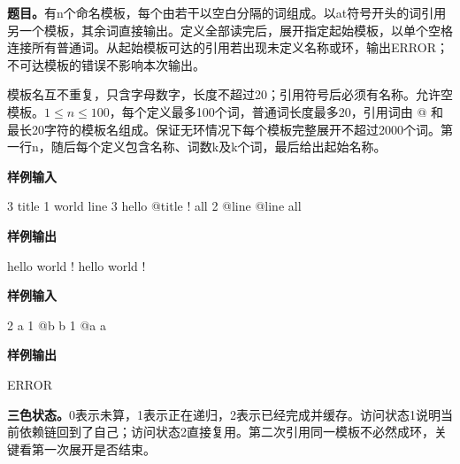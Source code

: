 \documentclass[UTF8,11pt,a4paper,fontset=none]{ctexart}
\begin{document}
\noindent\textbf{题目。}有n个命名模板，每个由若干以空白分隔的词组成。以at符号开头的词引用另一个模板，其余词直接输出。定义全部读完后，展开指定起始模板，以单个空格连接所有普通词。从起始模板可达的引用若出现未定义名称或环，输出ERROR；不可达模板的错误不影响本次输出。

模板名互不重复，只含字母数字，长度不超过20；引用符号后必须有名称。允许空模板。$1\le n\le100$，每个定义最多100个词，普通词长度最多20，引用词由 @ 和最长20字符的模板名组成。保证无环情况下每个模板完整展开不超过2000个词。第一行n，随后每个定义包含名称、词数k及k个词，最后给出起始名称。
\begin{tcolorbox}[samplebox,title={输入输出样例 1}]
\textbf{样例输入}
\begin{Sample}
3
title 1 world
line 3 hello @title !
all 2 @line @line
all
\end{Sample}
\tcblower
\textbf{样例输出}
\begin{Sample}
hello world ! hello world !
\end{Sample}
\end{tcolorbox}
\begin{tcolorbox}[samplebox,title={输入输出样例 2}]
\textbf{样例输入}
\begin{Sample}
2
a 1 @b
b 1 @a
a
\end{Sample}
\tcblower
\textbf{样例输出}
\begin{Sample}
ERROR
\end{Sample}
\end{tcolorbox}

\noindent\textbf{三色状态。}0表示未算，1表示正在递归，2表示已经完成并缓存。访问状态1说明当前依赖链回到了自己；访问状态2直接复用。第二次引用同一模板不必然成环，关键看第一次展开是否结束。
\end{document}
